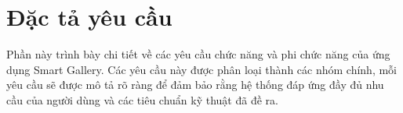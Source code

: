 \section{Đặc tả yêu cầu}

Phần này trình bày chi tiết về các yêu cầu chức năng và phi chức năng của ứng dụng Smart Gallery. Các yêu cầu này được phân loại thành các nhóm chính, mỗi yêu cầu sẽ được mô tả rõ ràng để đảm bảo rằng hệ thống đáp ứng đầy đủ nhu cầu của người dùng và các tiêu chuẩn kỹ thuật đã đề ra.



